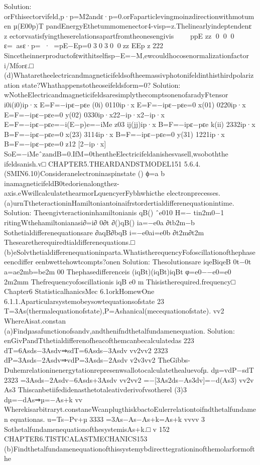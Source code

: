 {{{{{{{{{{Solution:
orFthisectorvifeld,p·p=M2andε·p=0.orFaparticlevingmoinzdirectionwithmotumen
µ(E00p)T
pandEnergyEthetummomenector4-visp=z.Thelinearlyindeptendenε
z
ectorvsatisfyingtheserelationsapartfromtheonesengivis

ppE
zz
000
ε=asε·p=·=pE−Ep=0
30300zz
EEp
z
222
Sincetheinnerproductofεwithitselfisp−E=−M,ewcouldhocosenormalizationfactor
i/Mforε.□
(d)Whataretheelectricandmagneticifeldsoftheemassivphotonifeldinthisthirdpolarization
state?Whathappenstotheoseifeldsform=0?
Solution:
wNotheElectricandmagneticifeldsaresimplythecomptsonenofaradyFtensor
i0i(i0)ip·x
E=F=−ipε−pεe
(0i)
0110ip·x
E=F=−ipε−pεe=0
x(01)
0220ip·x
E=F=−ipε−pεe=0
y(02)
0330ip·x22−ip·x2−ip·x
E=F=−ipε−pεe=−i(E−p)e=−iMe
z03
ij(jj)ip·x
B=F=−ipε−pεe
k(ii)
2332ip·x
B=F=−ipε−pεe=0
x(23)
3114ip·x
B=F=−ipε−pεe=0
y(31)
1221ip·x
B=F=−ipε−pεe=0
z12
[2−ip·x]
SoE=−iMeˆzandB=0.IfM=0thentheElectricifeldanishesvasell,wsoboththe
ifeldsanish.v□
CHAPTER5.THEARDANDSTMODEL151
5.6.4.(SMIN6.10)Consideranelectroninaspinstate
()
ϕ=a
b
inamagneticifeldB0tedorienalongthez-axis.eWwillcalculatethearmorLquencyerFybhwhicthe
electronprecesses.
(a)urnTtheteractioninHamiltoniantoinaifrstordertialdifferenequationintime.
Solution:
Theengivteractioninhamiltonianis
qB()
ˆe010
H=−
tin2m0−1
ritingWthehamiltonianasi∂=i∂
0∂t
∂()qB()
ia=−e0a
∂tb2m−b
Sothetialdifferenequationsare
∂aqB∂bqB
i=−e0ai=e0b
∂t2m∂t2m
Thesearetherequiredtialdifferenequations.□
(b)eSolvthetialdifferenequationinparta.WhatistherequencyFofoscillationofthephaseeencdiffer
eenbwettehowtcompts?onen
Solution:
Thesolutionsare
iqeBiqeB
0t−0t
a=ae2mb=be2m
00
Thephasedifferenceis
(iqBt)(iqBt)iqBt
φ=e0−−e0=e0
2m2mm
Thefrequencyofoscillationis
iqB
e0
m
Thisistherequired.frequency□
Chapter6
StatisticalhanicsMec
6.1orkHomewOne
6.1.1.Aparticularsystemobeysowtequationsofstate
23
T=3As(thermalequationofstate),P=Ashanical(mecequationofstate).
vv2
WhereAisat.constan
(a)Findµasafunctionofsandv,andthenifndthetalfundamenequation.
Solution:
enGivPandTthetialdifferenofheacofthemcanbecalculatedas
223
dT=6Asds−3Asdv⇒sdT=6Asds−3Asdv
vv2vv2
2323
dP=3Asds−2Asdv⇒vdP=3Asds−2Asdv
v2v3vv2
TheGibbs-Duhemrelationinenergytationrepresenwsallotocalculatethealuevofµ.
dµ=vdP−sdT
2323
=3Asds−2Asdv−6Asds+3Asdv
vv2vv2
=−[3As2ds−As3dv]=−d(As3)
vv2v
As3
Thiscanbetiifedidenasthetotaleativderivofvsotherel
(3)3
dµ=−dAs⇒µ=−As+k
vv
Wherekisarbitraryt.constaneWcanplugthiskbactoEulerrelationtoifndthetalfundamen
equationas.
u=Ts−Pv+µ
3333
=3As−As−As+k=As+k
vvvv
3
SothetalfundamenequationofthesystemisAs+k.□
v
152
CHAPTER6.TISTICALASTMECHANICS153
(b)Findthetalfundamenequationofthissystemybdirecttegrationinofthemolarformofthe
}}}}}}}}}}
